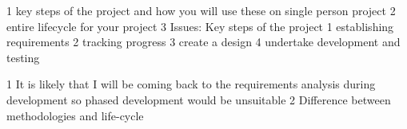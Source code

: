\documentclass[]{report}
\begin{document}
1 key steps of the project and how you will use these on single person project
2 entire lifecycle for your project
3 Issues: Key steps of the project
		1 establishing requirements
		2 tracking progress
		3 create a design
		4 undertake development and testing
		
		
		
 1 It is likely that I will be coming back to the requirements analysis during development so phased development would be unsuitable
 2 Difference between methodologies and life-cycle 
\end{document}
